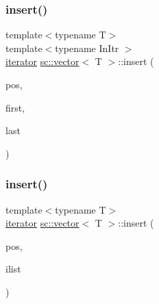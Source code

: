 \mbox{\label{classsc_1_1vector_a4cc533cc8f7fbd95ee965583650ee085}} 
\subsubsection{\texorpdfstring{insert()}{insert()}\hspace{0.1cm}{\footnotesize\ttfamily [2/9]}}
{\footnotesize\ttfamily template$<$typename T$>$ \\
template$<$typename In\+Itr $>$ \\
\mbox{\hyperlink{classsc_1_1vector_1_1iterator}{iterator}} \mbox{\hyperlink{classsc_1_1vector}{sc\+::vector}}$<$ T $>$\+::insert (\begin{DoxyParamCaption}\item[{\mbox{\hyperlink{classsc_1_1vector_1_1iterator}{iterator}}}]{pos,  }\item[{In\+Itr}]{first,  }\item[{In\+Itr}]{last }\end{DoxyParamCaption})}

\mbox{\label{classsc_1_1vector_a012eb735dde72dfb787dca4acea6c642}} 
\subsubsection{\texorpdfstring{insert()}{insert()}\hspace{0.1cm}{\footnotesize\ttfamily [3/9]}}
{\footnotesize\ttfamily template$<$typename T$>$ \\
\mbox{\hyperlink{classsc_1_1vector_1_1iterator}{iterator}} \mbox{\hyperlink{classsc_1_1vector}{sc\+::vector}}$<$ T $>$\+::insert (\begin{DoxyParamCaption}\item[{\mbox{\hyperlink{classsc_1_1vector_1_1iterator}{iterator}}}]{pos,  }\item[{std\+::initializer\+\_\+list$<$ T $>$}]{ilist }\end{DoxyParamCaption})}

\mbox{\label{classsc_1_1vector_a1aaf0a1fcdac2a58a96a2a00105b2e1f}} 

